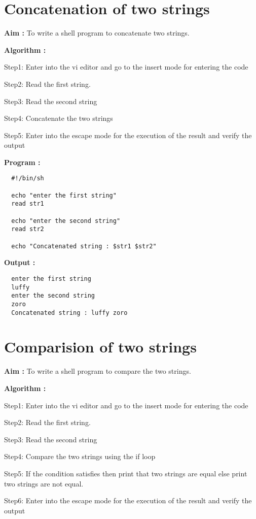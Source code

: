\documentclass[journal,onecolumn]{IEEEtran}
\begin{document}
\section{Concatenation of two strings}
\textbf{Aim :} To write a shell program to concatenate two strings.

\textbf{Algorithm :}
\begin{list}{}{}
  \item Step1: Enter into the vi editor and go to the insert mode for entering the code
  \item Step2: Read the first string.
  \item Step3: Read the second string
  \item Step4: Concatenate the two strings
  \item Step5: Enter into the escape mode for the execution of the result and verify the output
\end{list}


\textbf{Program :}
\begin{verbatim}
  #!/bin/sh

  echo "enter the first string"
  read str1
  
  echo "enter the second string"
  read str2
  
  echo "Concatenated string : $str1 $str2"
\end{verbatim}

\textbf{Output :}
\begin{verbatim}
  enter the first string
  luffy
  enter the second string
  zoro
  Concatenated string : luffy zoro
\end{verbatim}

\section{Comparision of two strings}
\textbf{Aim : } To write a shell program to compare the two strings.

\textbf{Algorithm : }
\begin{list}{}{}
  \item Step1: Enter into the vi editor and go to the insert mode for entering the code
  \item Step2: Read the first string.
  \item Step3: Read the second string
  \item Step4: Compare the two strings using the if loop
  \item Step5: If the condition satisfies then print that two strings are equal else print
        two strings are not equal.
  \item Step6: Enter into the escape mode for the execution of the result and verify the output
\end{list}
\end{document}

